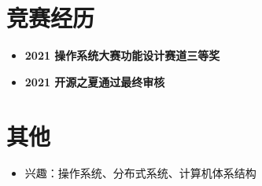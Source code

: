 \documentclass{cv}
\begin{document}
\section{竞赛经历}
\begin{itemize}
  \item \textbf{2021 操作系统大赛功能设计赛道}\quad \textbf{三等奖}
  \item \textbf{2021 开源之夏}\quad \textbf{通过最终审核}
\end{itemize}

\section{其他}
\begin{itemize}
  \item 兴趣：操作系统、分布式系统、计算机体系结构
\end{itemize}
\end{document}
